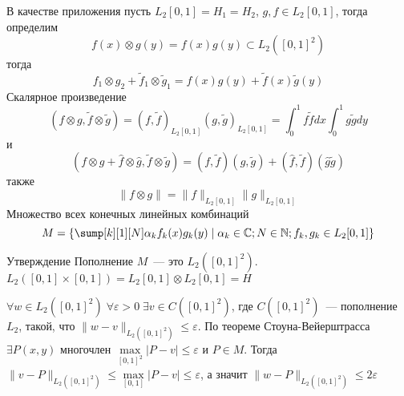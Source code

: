\documentclass[14pt]{extarticle}
\begin{document}
В качестве приложения пусть $L_2[0,1] = H_1 = H_2$, $g, f \in L_2[0,1]$, тогда
определим
$$
f(x) \otimes g(y) = f(x)g(y) \subset L_2([0,1]^2)
$$
тогда 
$$
f_1 \otimes g_2 + \tilde{f}_1 \otimes \tilde{g}_1 = f(x)g(y) + \tilde{f}(x)\tilde{g}(y)
$$
Скалярное произведение
$$
(f \otimes g, \tilde{f} \otimes \tilde{g}) = (f, \tilde{f})_{L_2[0,1]}(g, \tilde{g})_{L_2[0,1]}
= \int_0^1f\tilde{f}dx\int_0^1g\tilde{g}dy
$$
и
$$
(f \otimes g + \hat{f} \otimes \hat{g}, \tilde{f} \otimes \tilde{g}) = 
(f, \tilde{f})(g, \tilde{g}) + (\hat{f},\tilde{f})(\hat{g}\tilde{g})
$$
также
$$
\|f \otimes g\| = \|f\|_{L_2[0,1]}\|g\|_{L_2[0,1]}
$$
Множество всех конечных линейных комбинаций
$$
M = \{\sump[k][1][N] \alpha_k f_k(x) g_k(y) \mid \alpha_k \in \mathbb C; N \in 
\mathbb N; f_k,g_k \in L_2[0,1]\}
$$
\begin{MathCl}{Утверждение}
    Пополнение $M$~--- это $L_2([0,1]^2)$.
    $L_2([0,1] \times [0,1]) = L_2[0,1] \otimes L_2[0,1] = H$
\end{MathCl}
\begin{Proof}
    $\forall w \in L_2([0,1]^2)\;\forall \varepsilon > 0\; \exists v \in C([0,1]^2)$, где 
    $C([0,1]^2)$~--- пополнение $L_2$, такой, что $\|w - v\|_{L_2([0,1]^2)} \le 
    \varepsilon$.
    По теореме Стоуна-Вейерштрасса $\exists P(x,y)$ многочлен $\max \limits_
    {[0,1]^2}|P - v| \le \varepsilon$ и $P \in M$.
    Тогда $\|v - P\|_{L_2([0,1]^2)} \le \max \limits_
    {[0,1]}|P - v| \le \varepsilon$, а значит $\|w - P\|_{L_2([0,1]^2)} \le 2\varepsilon$
\end{Proof}
\end{document}
